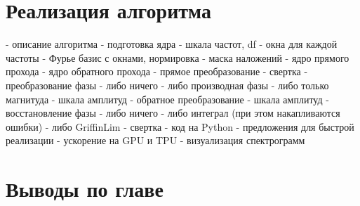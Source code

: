 \section{Реализация алгоритма}
\begin{markdown}
 - описание алгоритма
   - подготовка ядра
     - шкала частот, df
	 - окна для каждой частоты
	 - Фурье базис с окнами, нормировка
	 - маска наложений
	 - ядро прямого прохода
	 - ядро обратного прохода
   - прямое преобразование
     - свертка
	 - преобразование фазы
	   - либо ничего
	   - либо производная фазы
	   - либо только магнитуда
	 - шкала амплитуд
   - обратное преобразование
     - шкала амплитуд
	 - восстановление фазы
	   - либо ничего
	   - либо интеграл (при этом накапливаются ошибки)
	   - либо GriffinLim
	 - свертка
 - код на Python
 - предложения для быстрой реализации
 - ускорение на GPU и TPU
 - визуализация спектрограмм
\end{markdown}

\section{Выводы по главе}
